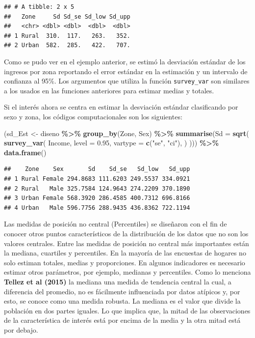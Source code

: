 \documentclass[
  spanish,
  12pt,
]{book}
\newenvironment{Shaded}{\begin{snugshade}}{\end{snugshade}}
\newcommand{\AttributeTok}[1]{\textcolor[rgb]{0.13,0.29,0.53}{#1}}
\newcommand{\FloatTok}[1]{\textcolor[rgb]{0.00,0.00,0.81}{#1}}
\newcommand{\FunctionTok}[1]{\textcolor[rgb]{0.13,0.29,0.53}{\textbf{#1}}}
\newcommand{\NormalTok}[1]{#1}
\newcommand{\OtherTok}[1]{\textcolor[rgb]{0.56,0.35,0.01}{#1}}
\newcommand{\SpecialCharTok}[1]{\textcolor[rgb]{0.81,0.36,0.00}{\textbf{#1}}}
\newcommand{\StringTok}[1]{\textcolor[rgb]{0.31,0.60,0.02}{#1}}
\begin{document}
\begin{verbatim}
## # A tibble: 2 x 5
##   Zone     Sd Sd_se Sd_low Sd_upp
##   <chr> <dbl> <dbl>  <dbl>  <dbl>
## 1 Rural  310.  117.   263.   352.
## 2 Urban  582.  285.   422.   707.
\end{verbatim}

Como se pudo ver en el ejemplo anterior, se estimó la desviación estándar de los ingresos por zona reportando el error estándar en la estimación y un intervalo de confianza al 95\%. Los argumentos que utiliza la función \texttt{survey\_var} son similares a los usados en las funciones anteriores para estimar medias y totales.

Si el interés ahora se centra en estimar la desviación estándar clasificando por sexo y zona, los códigos computacionales son los siguientes:

\begin{Shaded}
\begin{Highlighting}[]
\NormalTok{(sd\_Est }\OtherTok{\textless{}{-}}\NormalTok{ diseno }\SpecialCharTok{\%\textgreater{}\%} \FunctionTok{group\_by}\NormalTok{(Zone, Sex) }\SpecialCharTok{\%\textgreater{}\%}
   \FunctionTok{summarise}\NormalTok{(}\AttributeTok{Sd =} \FunctionTok{sqrt}\NormalTok{(}
  \FunctionTok{survey\_var}\NormalTok{(}
\NormalTok{    Income,}
    \AttributeTok{level =} \FloatTok{0.95}\NormalTok{,}
    \AttributeTok{vartype =}  \FunctionTok{c}\NormalTok{(}\StringTok{"se"}\NormalTok{, }\StringTok{"ci"}\NormalTok{),}
\NormalTok{   )}
\NormalTok{))) }\SpecialCharTok{\%\textgreater{}\%} \FunctionTok{data.frame}\NormalTok{()}
\end{Highlighting}
\end{Shaded}

\begin{verbatim}
##    Zone    Sex       Sd    Sd_se   Sd_low   Sd_upp
## 1 Rural Female 294.8683 111.6203 249.5537 334.0921
## 2 Rural   Male 325.7584 124.9643 274.2209 370.1890
## 3 Urban Female 568.3920 286.4585 400.7312 696.8166
## 4 Urban   Male 596.7756 288.9435 436.8362 722.1194
\end{verbatim}

Las medidas de posición no central (Percentiles) se diseñaron con el fin de conocer otros puntos característicos de la distribución de los datos que no son los valores centrales. Entre las medidas de posición no central más importantes están la mediana, cuartiles y percentiles. En la mayoría de las encuestas de hogares no solo estiman totales, medias y proporciones. En algunos indicadores es necesario estimar otros parámetros, por ejemplo, medianas y percentiles. Como lo menciona \textbf{Tellez et al (2015)} la mediana una medida de tendencia central la cual, a diferencia del promedio, no es fácilmente influenciada por datos atípicos y, por esto, se conoce como una medida robusta. La mediana es el valor que divide la población en dos partes iguales. Lo que implica que, la mitad de las observaciones de la característica de interés está por encima de la media y la otra mitad está por debajo.
\end{document}
